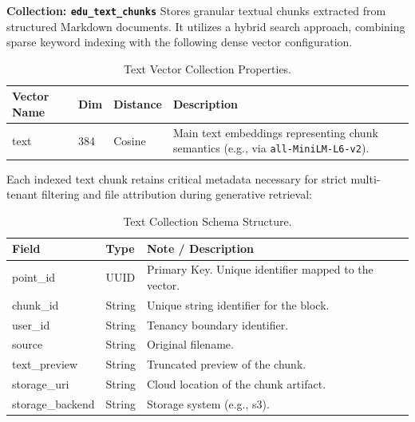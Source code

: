 \textbf{Collection: \texttt{edu\_text\_chunks}}
Stores granular textual chunks extracted from structured Markdown documents. It utilizes a hybrid search approach, combining sparse keyword indexing with the following dense vector configuration.
\begin{table}[H]
    \centering
    \caption{Text Vector Collection Properties.}
    \label{tab:qdrant_text}
    \begin{tabular}{lp{1cm}p{1.8cm}p{5.5cm}}
        \toprule
        \textbf{Vector Name} & \textbf{Dim} & \textbf{Distance} & \textbf{Description} \\
        \midrule
        text & 384 & Cosine & Main text embeddings representing chunk semantics (e.g., via \texttt{all-MiniLM-L6-v2}). \\
        \bottomrule
    \end{tabular}
\end{table}

Each indexed text chunk retains critical metadata necessary for strict multi-tenant filtering and file attribution during generative retrieval:
\begin{table}[H]
    \centering
    \caption{Text Collection Schema Structure.}
    \label{tab:qdrant_text_schema}
    \begin{tabular}{llp{8cm}}
        \toprule
        \textbf{Field} & \textbf{Type} & \textbf{Note / Description} \\
        \midrule
        point\_id & UUID & Primary Key. Unique identifier mapped to the vector. \\
        \midrule
        chunk\_id & String & Unique string identifier for the block. \\
        user\_id & String & Tenancy boundary identifier. \\
        source & String & Original filename. \\
        text\_preview & String & Truncated preview of the chunk. \\
        storage\_uri & String & Cloud location of the chunk artifact. \\
        storage\_backend & String & Storage system (e.g., s3). \\
        \bottomrule
    \end{tabular}
\end{table}

